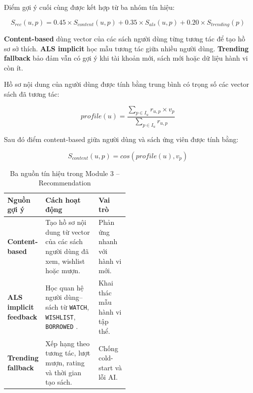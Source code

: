 Điểm gợi ý cuối cùng được kết hợp từ ba nhóm tín hiệu:

\[
S_{rec}(u,p) =
0.45 \times S_{content}(u,p)
+ 0.35 \times S_{als}(u,p)
+ 0.20 \times S_{trending}(p)
\]

\textbf{Content-based} dùng vector của các sách người dùng từng tương tác để tạo
hồ sơ sở thích. \textbf{ALS implicit} học mẫu tương tác giữa nhiều người dùng.
\textbf{Trending fallback} bảo đảm vẫn có gợi ý khi tài khoản mới, sách mới hoặc
dữ liệu hành vi còn ít.

Hồ sơ nội dung của người dùng được tính bằng trung bình có trọng số các vector
sách đã tương tác:

\[
profile(u) = \frac{\sum_{p \in I_u} r_{u,p} \times v_p}{\sum_{p \in I_u} r_{u,p}}
\]

Sau đó điểm content-based giữa người dùng và sách ứng viên được tính bằng:

\[
S_{content}(u,p) = cos(profile(u), v_p)
\]

\begin{table}[H]
\centering
\small
\renewcommand{\arraystretch}{1.15}
\setlength{\tabcolsep}{5pt}
\begin{tabularx}{\linewidth}{|>{\bfseries}p{0.24\linewidth}|>{\raggedright\arraybackslash}X|>{\raggedright\arraybackslash}p{0.25\linewidth}|}
\hline
\textbf{Nguồn gợi ý} & \textbf{Cách hoạt động} & \textbf{Vai trò} \\
\hline
\textbf{Content-based} & Tạo hồ sơ nội dung từ vector của các sách người dùng đã xem, wishlist hoặc mượn. & Phản ứng nhanh với hành vi mới. \\
\hline
\textbf{ALS implicit feedback} & Học quan hệ người dùng--sách từ \texttt{WATCH}, \texttt{WISHLIST}, \texttt{BORROWED} \cite{Hu2008ImplicitCF}. & Khai thác mẫu hành vi tập thể. \\
\hline
\textbf{Trending fallback} & Xếp hạng theo tương tác, lượt mượn, rating và thời gian tạo sách. & Chống cold-start và lỗi AI. \\
\hline
\end{tabularx}
\caption{Ba nguồn tín hiệu trong Module 3 -- Recommendation}
\label{tab:ai_recommendation_sources}
\end{table}

